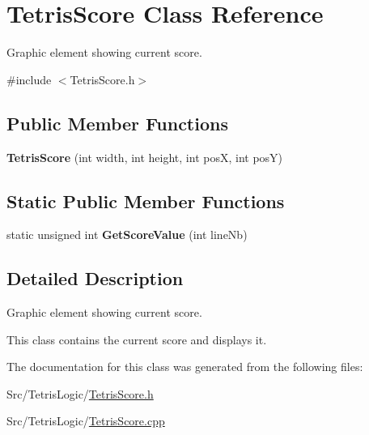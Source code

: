 \hypertarget{classTetrisScore}{\section{Tetris\-Score Class Reference}
\label{classTetrisScore}
}


Graphic element showing current score.  




{\ttfamily \#include $<$Tetris\-Score.\-h$>$}

\subsection*{Public Member Functions}
\begin{DoxyCompactItemize}
\item 
\hypertarget{classTetrisScore_afe132d1074ae1e288f3649ae747851ac}{{\bfseries Tetris\-Score} (int width, int height, int pos\-X, int pos\-Y)}\label{classTetrisScore_afe132d1074ae1e288f3649ae747851ac}

\end{DoxyCompactItemize}
\subsection*{Static Public Member Functions}
\begin{DoxyCompactItemize}
\item 
\hypertarget{classTetrisScore_a827b78509720ee5fcba2e25e4e6bd5f5}{static unsigned int {\bfseries Get\-Score\-Value} (int line\-Nb)}\label{classTetrisScore_a827b78509720ee5fcba2e25e4e6bd5f5}

\end{DoxyCompactItemize}


\subsection{Detailed Description}
Graphic element showing current score. 

This class contains the current score and displays it. 

The documentation for this class was generated from the following files\-:\begin{DoxyCompactItemize}
\item 
Src/\-Tetris\-Logic/\hyperlink{TetrisScore_8h}{Tetris\-Score.\-h}\item 
Src/\-Tetris\-Logic/\hyperlink{TetrisScore_8cpp}{Tetris\-Score.\-cpp}\end{DoxyCompactItemize}
